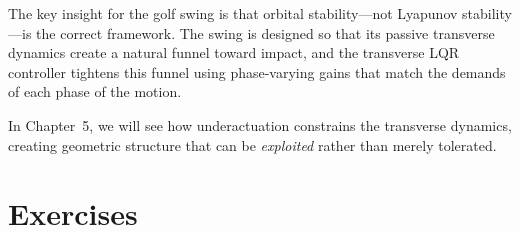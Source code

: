 \documentclass[12pt, openany]{book}
\theoremstyle{plain}
\begin{document}
The key insight for the golf swing is that orbital stability---not Lyapunov
stability---is the correct framework. The swing is designed so that its
passive transverse dynamics create a natural funnel toward impact, and the
transverse LQR controller tightens this funnel using phase-varying gains
that match the demands of each phase of the motion.

In Chapter~5, we will see how underactuation constrains the transverse dynamics,
creating geometric structure that can be \emph{exploited} rather than merely
tolerated.

\section{Exercises}
\end{document}
